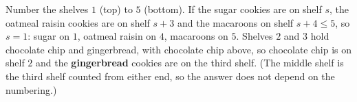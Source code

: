 Number the shelves $1$ (top) to $5$ (bottom). If the sugar cookies are on shelf $s$, the oatmeal raisin cookies are on shelf $s+3$ and the macaroons on shelf $s+4\le5$, so $s=1$: sugar on $1$, oatmeal raisin on $4$, macaroons on $5$. Shelves $2$ and $3$ hold chocolate chip and gingerbread, with chocolate chip above, so chocolate chip is on shelf $2$ and the \textbf{gingerbread} cookies are on the third shelf. (The middle shelf is the third shelf counted from either end, so the answer does not depend on the numbering.)
